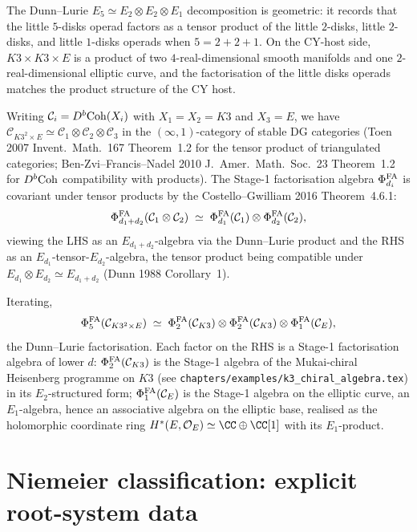 The Dunn--Lurie $E_5 \simeq E_2 \otimes E_2 \otimes E_1$
decomposition is geometric: it records that the little $5$-disks
operad factors as a tensor product of the little $2$-disks,
little $2$-disks, and little $1$-disks operads when $5 = 2 + 2 + 1$.
On the CY-host side, $K3 \times K3 \times E$ is a product of two
$4$-real-dimensional smooth manifolds and one $2$-real-dimensional
elliptic curve, and the factorisation of the little disks operads
matches the product structure of the CY host.

Writing $\mathcal C_i = D^b\mathrm{Coh}(X_i)$ with $X_1 = X_2 = K3$ and
$X_3 = E$, we have
$\mathcal C_{K3^2 \times E} \simeq \mathcal C_1 \otimes \mathcal C_2
\otimes \mathcal C_3$ in the $(\infty, 1)$-category of stable DG
categories (Toen 2007 Invent.\ Math.\ 167 Theorem~1.2 for the
tensor product of triangulated categories;
Ben-Zvi--Francis--Nadel 2010 J.\ Amer.\ Math.\ Soc.\ 23 Theorem~1.2
for $D^b\mathrm{Coh}$ compatibility with products). The Stage-1
factorisation algebra $\Phi^{\mathrm{FA}}_{d_i}$ is covariant under tensor
products by the Costello--Gwilliam 2016 Theorem~4.6.1:
\[
  \Phi^{\mathrm{FA}}_{d_1 + d_2}(\mathcal C_1 \otimes \mathcal C_2)
  \;\simeq\;
  \Phi^{\mathrm{FA}}_{d_1}(\mathcal C_1) \otimes \Phi^{\mathrm{FA}}_{d_2}(\mathcal C_2),
\]
viewing the LHS as an $E_{d_1 + d_2}$-algebra via the Dunn--Lurie
product and the RHS as an $E_{d_1}$-tensor-$E_{d_2}$-algebra, the
tensor product being compatible under $E_{d_1} \otimes E_{d_2} \simeq
E_{d_1 + d_2}$ (Dunn 1988 Corollary~1).

Iterating,
\[
  \Phi^{\mathrm{FA}}_5(\mathcal C_{K3^2 \times E})
  \;\simeq\;
  \Phi^{\mathrm{FA}}_2(\mathcal C_{K3}) \otimes \Phi^{\mathrm{FA}}_2(\mathcal C_{K3}) \otimes
  \Phi^{\mathrm{FA}}_1(\mathcal C_E),
\]
the Dunn--Lurie factorisation. Each factor on the RHS is a
Stage-1 factorisation algebra of lower $d$: $\Phi^{\mathrm{FA}}_2(\mathcal C_{K3})$
is the Stage-1 algebra of the Mukai-chiral Heisenberg programme
on $K3$ (see \texttt{chapters/examples/k3\_chiral\_algebra.tex})
in its $E_2$-structured form; $\Phi^{\mathrm{FA}}_1(\mathcal C_E)$ is the
Stage-1 algebra on the elliptic curve, an $E_1$-algebra, hence an
associative algebra on the elliptic base, realised as the holomorphic
coordinate ring $H^*(E, \mathcal O_E) \simeq \CC \oplus \CC[1]$ with
its $E_1$-product.

\section*{Niemeier classification: explicit root-system data}

